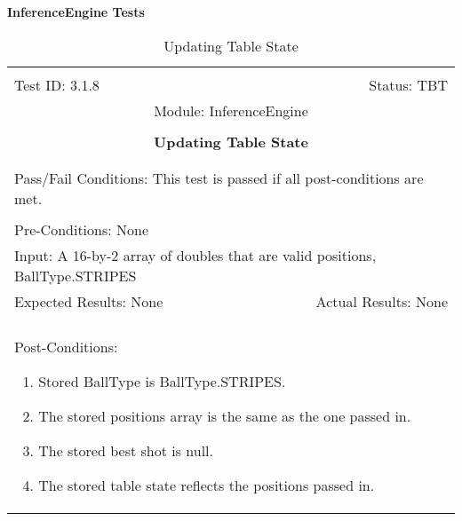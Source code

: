 \documentclass[titlepage]{article}
\begin{document}
\large{\textbf{InferenceEngine Tests}}
\begin{center}%
\begin{table}
\begin{tabular}{|l r|}\hline&\\[-2mm]
	Test ID: 3.1.8	&Status: TBT\\[-3mm]
	\multicolumn{2}{|c|}{Module: InferenceEngine}\\&\\
	\multicolumn{2}{|c|}{\textbf{\large{Updating Table State}}}\\&\\\hline&\\[-3mm]
	\multicolumn{2}{|p{\textwidth}|}{Pass/Fail Conditions: This test is passed if all post-conditions are met.}\\[1mm]\hline&\\[-3mm]
	\multicolumn{2}{|p{\textwidth}|}{Pre-Conditions: None}\\[4mm]
	\multicolumn{2}{|p{\textwidth}|}{Input: A 16-by-2 array of doubles that are valid positions, BallType.STRIPES}\\[2mm]\hline
	\multicolumn{1}{|p{0.49\textwidth}}{Expected Results: None}	&\multicolumn{1}{|p{0.45\textwidth}|}{Actual Results: None}\\\hline&\\[-3mm]
	\multicolumn{2}{|p{\textwidth}|}{Post-Conditions: \begin{enumerate}\item Stored BallType is BallType.STRIPES. \item The stored positions array is the same as the one passed in. \item The stored best shot is null. \item The stored table state reflects the positions passed in.\end{enumerate}}\\\hline
\end{tabular}
\caption{Updating Table State}
\end{table}
\end{center}
\end{document}

